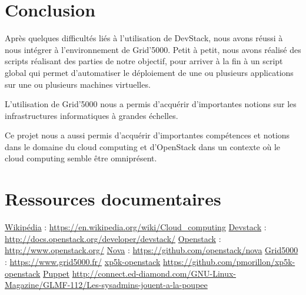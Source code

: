 \documentclass{report}
\begin{document}
\newpage
\chapter{Conclusion}
    Après quelques difficultés liés à l'utilisation de DevStack, nous avons réussi à nous intégrer à l'environnement de Grid'5000. Petit à petit, nous avons réalisé des scripts réalisant des parties de notre objectif, pour arriver à la fin à un script global qui permet d'automatiser le déploiement de une ou plusieurs applications sur une ou plusieurs machines virtuelles.\bigbreak


    L'utilisation de Grid'5000 nous a permis d'acquérir d'importantes notions sur les infrastructures informatiques à grandes échelles.\bigbreak
    
    Ce projet nous a aussi permis d'acquérir d'importantes compétences et notions dans le domaine du cloud computing et d'OpenStack dans un contexte où le cloud computing semble être omniprésent.\bigbreak
    
 
\newpage
\chapter*{Ressources documentaires}
\href{https://en.wikipedia.org/wiki/Cloud_computing}{Wikipédia} :
\url{https://en.wikipedia.org/wiki/Cloud_computing}
\bigbreak
\href{http://docs.openstack.org/developer/devstack/}{Devstack} :
\url{http://docs.openstack.org/developer/devstack/}
\bigbreak
\href{http://www.openstack.org/}{Openstack} :
\url{http://www.openstack.org/}
\bigbreak
\href{https://github.com/openstack/nova}{Nova} :
\url{https://github.com/openstack/nova}
\bigbreak
\href{https://www.grid5000.fr/}{Grid5000} :
\url{https://www.grid5000.fr/}
\bigbreak
\href{https://github.com/pmorillon/xp5k-openstack}{xp5k-openstack}
\url{https://github.com/pmorillon/xp5k-openstack}
\bigbreak
\href{http://connect.ed-diamond.com/GNU-Linux-Magazine/GLMF-112/Les-sysadmins-jouent-a-la-poupee}{Puppet}
\url{http://connect.ed-diamond.com/GNU-Linux-Magazine/GLMF-112/Les-sysadmins-jouent-a-la-poupee}


\printbibliography


\newpage
\end{document}
